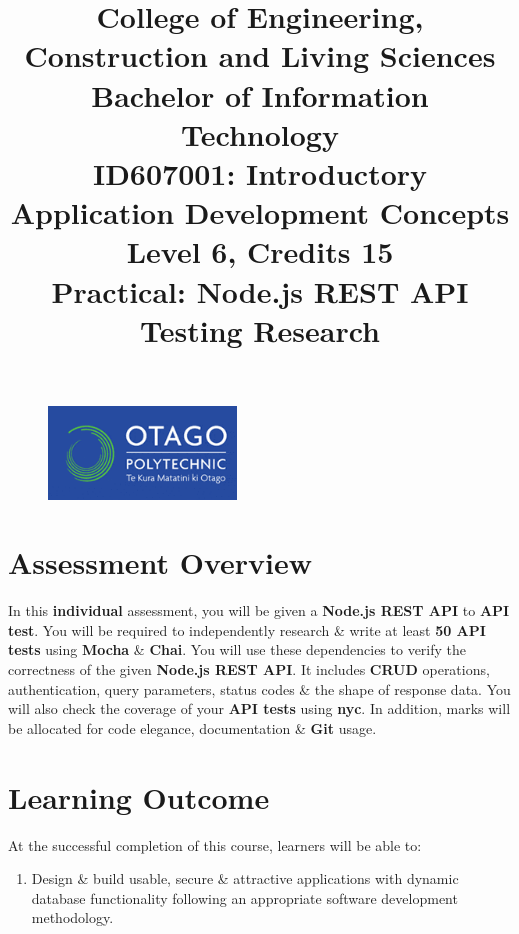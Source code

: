 \documentclass{article}
\author{}
\begin{document}
\begin{figure}
    \centering
    \includegraphics[width=50mm]{../img/logo.png}
\end{figure}

\title{College of Engineering, Construction and Living Sciences\\Bachelor of Information Technology\\ID607001: Introductory Application Development Concepts\\Level 6, Credits 15\\\textbf{Practical: Node.js REST API Testing Research}}
\date{}
\maketitle

\section*{Assessment Overview}
In this \textbf{individual} assessment, you will be given a \textbf{Node.js REST API} to \textbf{API test}. You will be required to independently research \& write at least \textbf{50 API tests} using \textbf{Mocha} \& \textbf{Chai}. You will use these dependencies to verify the correctness of the given \textbf{Node.js REST API}. It includes \textbf{CRUD} operations, authentication, query parameters, status codes \& the shape of response data. You will also check the coverage of your \textbf{API tests} using \textbf{nyc}. In addition, marks will be allocated for code elegance, documentation \& \textbf{Git} usage. 

\section*{Learning Outcome}
At the successful completion of this course, learners will be able to:
\begin{enumerate}
    \item Design \& build usable, secure \& attractive applications with dynamic database functionality following an appropriate software development methodology.
\end{enumerate}
\end{document}

